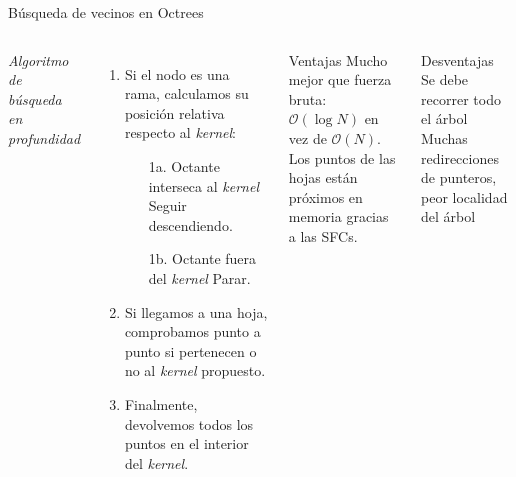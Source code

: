 \documentclass[aspectratio=169]{beamer}
\begin{document}
\begin{frame}{Búsqueda de vecinos en Octrees}
    \begin{columns}
    \textit{Algoritmo de búsqueda en profundidad}
    \vspace{1em}
        \begin{enumerate}
            \item Si el nodo es una rama, calculamos su posición relativa respecto al \textit{kernel}:
            \begin{enumerate}
                \item[1a.] Octante interseca al \textit{kernel} \textrightarrow\: Seguir descendiendo.
                \item[1b.] Octante fuera del \textit{kernel} \textrightarrow\:  Parar.
            \end{enumerate}
            \item Si llegamos a una hoja, comprobamos punto a punto si pertenecen o no al \textit{kernel} propuesto. 
            \item Finalmente, devolvemos todos los puntos en el interior del \textit{kernel}.
        \end{enumerate}
        \begin{exampleblock}{Ventajas}
            \textrightarrow \: Mucho mejor que fuerza bruta: $\mathcal{O}(\log{N})$ en vez de $\mathcal{O}(N)$. \\
            \textrightarrow \: Los puntos de las hojas están próximos en memoria gracias a las SFCs. \\
        \end{exampleblock}
        \begin{alertblock}{Desventajas}
            \textrightarrow \: Se debe recorrer todo el árbol \\
            \textrightarrow \: Muchas redirecciones de punteros, peor localidad del árbol \\
        \end{alertblock}
    \end{columns}
\end{frame}
\end{document}
